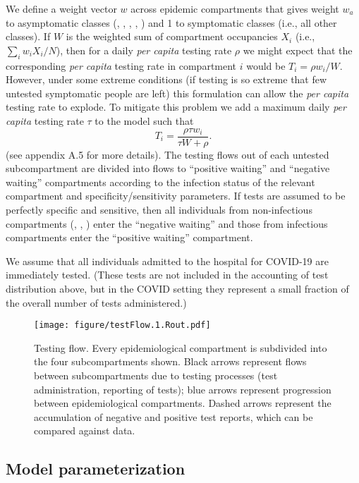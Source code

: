 \documentclass[12pt]{article}\usepackage[]{graphicx}\usepackage[]{color}
\begin{document}
We define a weight vector $w$ across epidemic compartments that gives weight $w_a$ to asymptomatic classes (, , , , ) and 1 to symptomatic classes (i.e., all other classes).
If $W$ is the weighted sum of compartment occupancies $X_i$ (i.e., $\sum_i w_i X_i/N$), then for a daily \emph{per capita} testing rate $\rho$ we might expect that the corresponding \emph{per capita} testing rate in compartment $i$ would be $T_i = \rho w_i/W$. 
However, under some extreme conditions (if testing is so extreme that few untested symptomatic people are left) this formulation can allow the \emph{per capita} testing rate to explode. To mitigate this problem we add a maximum daily \emph{per capita} testing rate $\tau$ to the model such that
\[T_i = \frac{\rho \tau w_i}{\tau W + \rho} .\] (see \cite{Ghar+22} appendix A.5 for more details).
The testing flows out of each untested subcompartment are divided into flows to ``positive waiting'' and ``negative waiting'' compartments according to the infection status of the relevant compartment and specificity/sensitivity parameters. If tests are assumed to be perfectly specific and sensitive, then all individuals from non-infectious compartments (, , ) enter the ``negative waiting'' and those from infectious compartments enter the ``positive waiting'' compartment.

We assume that all individuals admitted to the hospital for COVID-19 are immediately tested. (These tests are not included in the accounting of test distribution above, but in the COVID setting they represent a small fraction of the overall number of tests administered.)

\begin{figure}
  \texttt{[image: figure/testFlow.1.Rout.pdf]}
  \caption{Testing flow. Every epidemiological compartment is subdivided into the four subcompartments shown.
    Black arrows represent flows between subcompartments due to testing processes (test administration, reporting of tests); blue arrows represent progression between epidemiological compartments.
    Dashed arrows represent the accumulation of negative and positive test reports, which can be compared against data.
    }
  \label{fig:testing_flow}
\end{figure}

\subsection*{Model parameterization}
\end{document}
